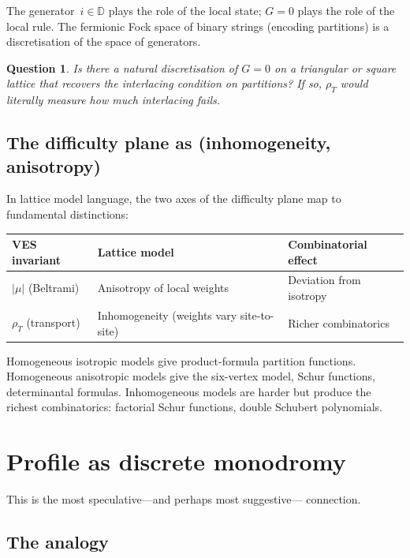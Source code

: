 \documentclass[11pt]{article}
\newcommand{\D}{\mathbb{D}}
\newcommand{\rhoT}{\rho_T}
\theoremstyle{plain}
\newtheorem{question}{Question}
\theoremstyle{definition}
\theoremstyle{remark}
\begin{document}
The generator~$i\in\D$ plays the role of the local state; $G=0$
plays the role of the local rule. The fermionic Fock space of binary
strings (encoding partitions) is a discretisation of the space of
generators.

\begin{question}
Is there a natural discretisation of $G=0$ on a triangular or
square lattice that recovers the interlacing condition on
partitions? If so, $\rhoT$ would literally measure \emph{how much
interlacing fails}.
\end{question}

\subsection{The difficulty plane as (inhomogeneity, anisotropy)}

In lattice model language, the two axes of the difficulty plane map
to fundamental distinctions:

\medskip
\begin{center}
\begin{tabular}{@{}lll@{}}
\toprule
\textbf{VES invariant} & \textbf{Lattice model} & \textbf{Combinatorial effect} \\
\midrule
$|\mu|$ (Beltrami) & Anisotropy of local weights &
  Deviation from isotropy \\
$\rhoT$ (transport) & Inhomogeneity (weights vary site-to-site) &
  Richer combinatorics \\
\bottomrule
\end{tabular}
\end{center}
\medskip

Homogeneous isotropic models give product-formula partition functions.
Homogeneous anisotropic models give the six-vertex model, Schur
functions, determinantal formulas. Inhomogeneous models are harder but
produce the richest combinatorics: factorial Schur functions, double
Schubert polynomials.


\section{Profile as discrete monodromy}
\label{sec:monodromy}

This is the most speculative---and perhaps most suggestive---
connection.

\subsection{The analogy}
\end{document}
